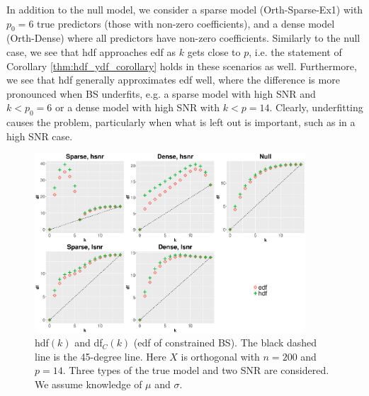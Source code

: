 In addition to the null model, we consider a sparse model (Orth-Sparse-Ex1) with $p_0=6$ true predictors (those with non-zero coefficients), and a dense model (Orth-Dense) where all predictors have non-zero coefficients. Similarly to the null case, we see that hdf approaches edf as $k$ gets close to $p$, i.e. the statement of Corollary \ref{thm:hdf_ydf_corollary} holds in these scenarios as well. Furthermore, we see that hdf generally approximates edf well, where the difference is more pronounced when BS underfits, e.g. a sparse model with high SNR and $k<p_0=6$ or a dense model with high SNR with $k<p=14$. Clearly, underfitting causes the problem, particularly when what is left out is important, such as in a high SNR case.   


\begin{figure}[!ht]
	\centering
	\includegraphics[width=0.9\textwidth]{figures/hdf_edf_bs.eps}
	\caption{hdf$(k)$ and df$_C(k)$ (edf of constrained BS). The black dashed line is the 45-degree line. Here $X$ is orthogonal with $n=200$ and $p=14$. Three types of the true model and two SNR are considered. We assume knowledge of $\mu$ and $\sigma$.}
	\label{fig:dfc_dflambda}
\end{figure}



